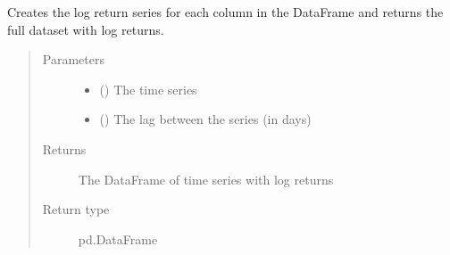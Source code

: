 \documentclass[letterpaper,10pt,english]{sphinxmanual}
\begin{document}
\begin{fulllineitems}
\label{\detokenize{index:Forecaster.preprocessing.generate_lg_return}}
Creates the log return series for each column in the DataFrame
and returns the full dataset with log returns.
\begin{quote}\begin{description}
\item[{Parameters}] \leavevmode\begin{itemize}
\item {} 
 () \textendash{} The time series

\item {} 
 () \textendash{} The lag between the series (in days)

\end{itemize}

\item[{Returns}] \leavevmode
The DataFrame of time series with log returns

\item[{Return type}] \leavevmode
pd.DataFrame

\end{description}\end{quote}

\end{fulllineitems}

\end{document}

